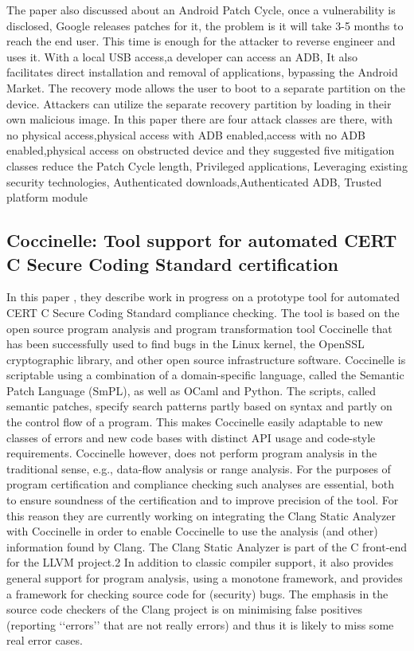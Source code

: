  The paper also discussed about an Android Patch Cycle, once a vulnerability is disclosed, Google releases patches for it, the problem is it will take 3-5 months to reach the end user. This time is enough for the attacker to reverse engineer and uses it. With a local USB access,a developer can access an ADB,  It also facilitates direct installation and removal of applications, bypassing the Android Market. The recovery mode allows the user to boot to a separate partition on the device. Attackers can utilize the separate recovery partition by loading in their own malicious image. In this paper there are four attack classes are there, with no physical access,physical access with ADB enabled,access with no ADB enabled,physical access on obstructed device and they suggested five mitigation classes reduce the Patch Cycle length, Privileged applications, Leveraging existing security technologies, Authenticated downloads,Authenticated ADB, Trusted platform module  
\subsection{Coccinelle: Tool support for automated CERT C Secure Coding Standard certification}

In this paper \cite{olesen2010clang}, they describe work in progress on a prototype tool for automated CERT C Secure Coding Standard compliance checking. The tool
is based on the open source program analysis and program transformation tool Coccinelle that has been successfully used to find bugs in the Linux kernel, the OpenSSL cryptographic library, and other open source infrastructure software. Coccinelle is scriptable using a combination of a domain-specific language, called the Semantic Patch Language (SmPL), as well as OCaml and Python. The scripts, called semantic patches, specify search patterns partly based on syntax and partly on the control flow of a program. This makes Coccinelle easily adaptable to new classes of errors and new code bases with distinct API usage and code-style requirements. Coccinelle however, does not perform program analysis in the traditional sense, e.g., data-flow analysis or range analysis.
For the purposes of program certification and compliance checking such analyses are essential, both to ensure soundness of the certification and to improve precision of the tool. For this reason they are currently working on integrating the Clang Static Analyzer with Coccinelle in order to enable Coccinelle to use the analysis (and other) information found by Clang. The Clang Static Analyzer is part of the C front-end for the LLVM project.2 In addition to classic compiler support, it also provides general support for program analysis, using a monotone framework, and provides a framework for checking source code for (security) bugs. The emphasis in the source code checkers of the Clang project is on minimising false positives (reporting ‘‘errors’’ that are not really errors) and thus it is likely to miss some real error cases. 

